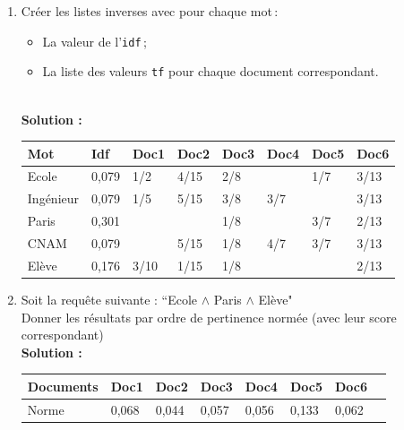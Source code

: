 \documentclass[9pt,a4paper]{article}
\newenvironment{solution}[0]{
~\\ \color{red} \textbf{Solution :}\color{black}}{%
}
\begin{document}
\begin{enumerate}
  \item Cr\'eer les listes inverses avec pour chaque mot\,:
  	\begin{itemize}
  	  \item La valeur de l'{\tt idf}\,;
  	  \item La liste des valeurs {\tt tf} pour chaque document correspondant.
   	\end{itemize} 
\begin{solution}

\begin{tabular}{*{8}{|l}|}
\hline
Mot		& Idf		&Doc1	& Doc2	&Doc3	&Doc4	&Doc5	&Doc6\\
\hline
\hline
Ecole	& 0,079 	&1/2	&4/15	&2/8	&		&1/7	&3/13\\
\hline
Ing\'enieur	&0,079	&1/5	&5/15	&3/8	&3/7	&		&3/13\\
\hline
Paris	&0,301		&		&		&1/8	&		&3/7	&2/13\\
\hline
CNAM	&0,079		&		&5/15	&1/8	&4/7	&3/7	&3/13\\
\hline
El\`eve	&0,176		&3/10	&1/15	&1/8	&		&		&2/13\\
\hline
\end{tabular}

\end{solution}

	\item Soit la requ\^ete suivante : ``Ecole $\land$ Paris $\land$ El\`eve"\\
	Donner les r\'esultats par ordre de pertinence norm\'ee (avec leur score correspondant) 
\begin{solution}

\begin{tabular}{*{8}{|l}|}
\hline
Documents	&Doc1	&Doc2	&Doc3	&Doc4	&Doc5	&Doc6\\
\hline
Norme		&0,068	&0,044	&0,057	&0,056	&0,133	&0,062\\
\hline
\end{tabular}


\end{solution}
\end{enumerate}
\end{document}
